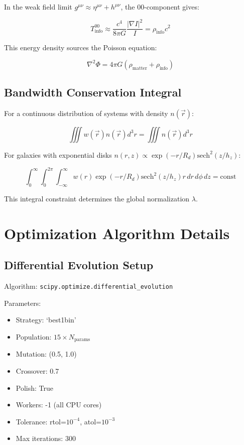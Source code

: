 \documentclass[12pt,letterpaper]{article}
\begin{document}
In the weak field limit $g^{\mu\nu} \approx \eta^{\mu\nu} + h^{\mu\nu}$, the 00-component gives:

\begin{equation}
T^{00}_{\text{info}} \approx \frac{c^4}{8\pi G}\frac{|\nabla I|^2}{I} = \rho_{\text{info}}c^2
\end{equation}

This energy density sources the Poisson equation:

\begin{equation}
\nabla^2\Phi = 4\pi G(\rho_{\text{matter}} + \rho_{\text{info}})
\end{equation}

\subsection{Bandwidth Conservation Integral}

For a continuous distribution of systems with density $n(\vec{r})$:

\begin{equation}
\iiint w(\vec{r}) n(\vec{r}) d^3r = \iiint n(\vec{r}) d^3r
\end{equation}

For galaxies with exponential disks $n(r,z) \propto \exp(-r/R_d)\text{sech}^2(z/h_z)$:

\begin{equation}
\int_0^\infty \int_0^{2\pi} \int_{-\infty}^\infty w(r) \exp(-r/R_d) \text{sech}^2(z/h_z) r \, dr \, d\phi \, dz = \text{const}
\end{equation}

This integral constraint determines the global normalization $\lambda$.

\section{Optimization Algorithm Details}

\subsection{Differential Evolution Setup}

Algorithm: \texttt{scipy.optimize.differential\_evolution}

Parameters:
\begin{itemize}
\item Strategy: `best1bin'
\item Population: $15 \times N_{\text{params}}$
\item Mutation: (0.5, 1.0)
\item Crossover: 0.7
\item Polish: True
\item Workers: -1 (all CPU cores)
\item Tolerance: rtol=$10^{-4}$, atol=$10^{-3}$
\item Max iterations: 300
\end{itemize}
\end{document}
